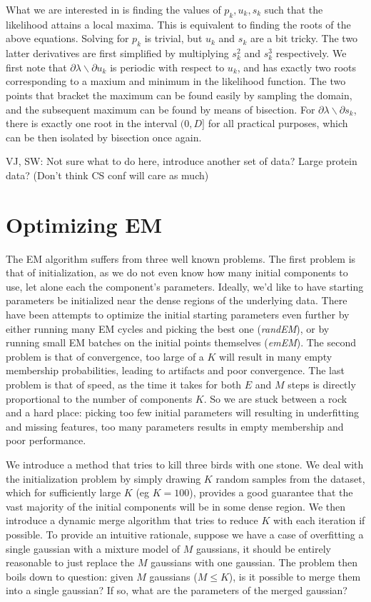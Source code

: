 \documentclass{acm_proc_article-sp}
\begin{document}
What we are interested in is finding the values of \textbf{$p_k, u_k, s_k$} such that the likelihood attains a local maxima. This is equivalent to finding the roots of the above equations. Solving for \(p_k\) is trivial, but \(u_k\) and \(s_k\) are a bit tricky.  The two latter derivatives are first simplified by multiplying \(s_k^2\) and \(s_k^3\) respectively. We first note that \(\partial \lambda \backslash \partial u_k \) is periodic with respect to \(u_k\), and has exactly two roots corresponding to a  maxium  and minimum in the likelihood function. The two points that bracket the maximum can be found easily by sampling the domain, and the subsequent maximum can be found by means of bisection. For \(\partial \lambda \backslash \partial s_k\), there is exactly one root in the interval \((0, D]\) for all practical purposes, which can be then isolated by bisection once again.

VJ, SW: Not sure what to do here, introduce another set of data? Large protein data? (Don't think CS conf will care as much)

\section{Optimizing EM}
The EM algorithm suffers from three well known problems. The first problem is that of initialization, as we do not even know how many initial components to use, let alone each the component's parameters. Ideally, we'd like to have starting parameters be initialized near the dense regions of the underlying data. There have been attempts to optimize the initial starting parameters even further by either running many EM cycles and picking the best one ({\it randEM}), or by running small EM batches on the initial points themselves ({\it emEM}). The second problem is that of convergence, too large of a $K$ will result in many empty membership probabilities, leading to artifacts and poor convergence. The last problem is that of speed, as the time it takes for both $E$ and $M$ steps is directly proportional to the number of components $K$. So we are stuck between a rock and a hard place: picking too few initial parameters will resulting in underfitting and missing features, too many parameters results in empty membership and poor performance.

We introduce a method that tries to kill three birds with one stone. We deal with the initialization problem by simply drawing $K$ random samples from the dataset, which for sufficiently large $K$ (eg $K=100$), provides a good guarantee that the vast majority of the initial components will be in some dense region. We then introduce a dynamic merge algorithm that tries to reduce $K$ with each iteration if possible. To provide an intuitive rationale, suppose we have a case of overfitting a single gaussian with a mixture model of $M$ gaussians, it should be entirely reasonable to just replace the $M$ gaussians with one gaussian. The problem then boils down to question: given $M$ gaussians ($M \leq K$), is it possible to merge them into a single gaussian? If so, what are the parameters of the merged gaussian? 
\end{document}
